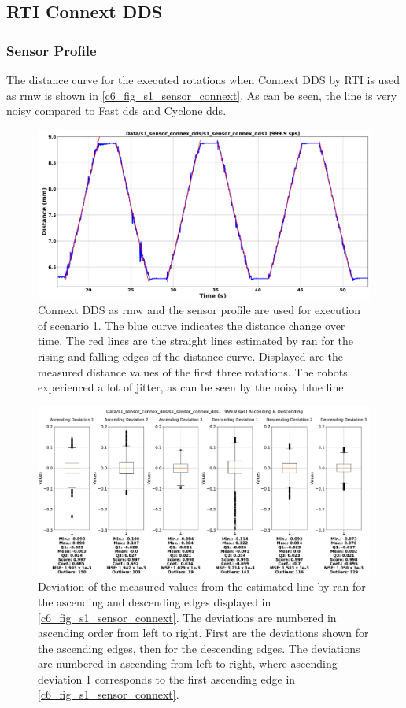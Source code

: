 \subsection{RTI Connext DDS}
\subsubsection{Sensor Profile}The distance curve for the executed rotations when Connext DDS by RTI is used as \gls{rmw} is shown in \autoref{c6_fig_s1_sensor_connext}. As can be seen, the line is very noisy compared to Fast \gls{dds} and Cyclone \gls{dds}.
\begin{figure}[htbp]
	\centering
	\includegraphics[width=1\textwidth]{Figures/c6/s1/s1_sensor_connext_dds.pdf}
	\caption{Connext DDS as \gls{rmw} and the sensor profile are used for execution of scenario 1. The blue curve indicates the distance change over time. The red lines are the straight lines estimated by \gls{ran} for the rising and falling edges of the distance curve. Displayed are the measured distance values of the first three rotations. The robots experienced a lot of jitter, as can be seen by the noisy blue line.}
	\label{c6_fig_s1_sensor_connext}
\end{figure}
\begin{figure}[htbp]
	\centering
	\includegraphics[width=1\textwidth]{Figures/c6/s1/s1_sensor_connext_dds_1_box_aio.pdf}
	\caption{Deviation of the measured values from the estimated line by \gls{ran} for the ascending and descending edges displayed in \autoref{c6_fig_s1_sensor_connext}. The deviations are numbered in ascending order from left to right. First are the deviations shown for the ascending edges, then for the descending edges. The deviations are numbered in ascending from left to right, where ascending deviation 1 corresponds to the first ascending edge in \autoref{c6_fig_s1_sensor_connext}.}
	\label{c6_fig_s1_connext_box_aio}
\end{figure}
